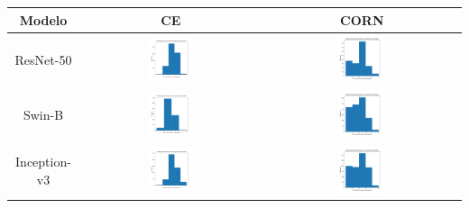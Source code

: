 \begin{table}[!htbp]
    \centering
    \begin{tabular}{|c|c|c|}
        \hline
        \textbf{Modelo} & \textbf{CE} & \textbf{CORN} \\ \hline
        ResNet-50 & \includegraphics[width=0.25\textwidth]{figs/conformal_prediction/resnet50_cp_cross_entropy.png} & \includegraphics[width=0.25\textwidth]{figs/conformal_prediction/resnet50_cp_corn.png} \\ \hline
        Swin-B & \includegraphics[width=0.25\textwidth]{figs/conformal_prediction/swin_b_cp_cross_entropy.png} & \includegraphics[width=0.25\textwidth]{figs/conformal_prediction/swin_b_cp_corn.png} \\ \hline
        Inception-v3 & \includegraphics[width=0.25\textwidth]{figs/conformal_prediction/inception_v3_cp_cross_entropy.png} & \includegraphics[width=0.25\textwidth]{figs/conformal_prediction/inception_v3_cp_corn.png} \\ \hline

\end{tabular}
\end{table}
